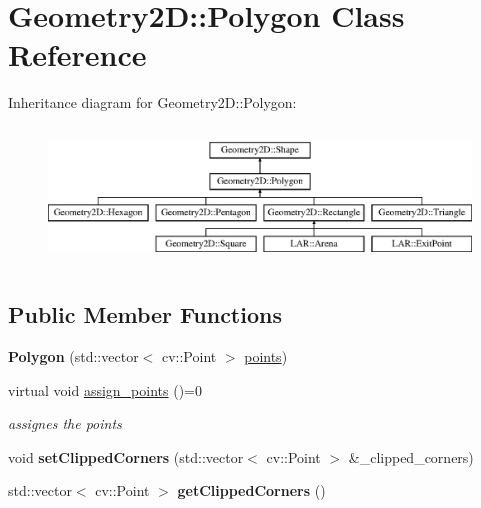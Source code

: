 \hypertarget{class_geometry2_d_1_1_polygon}{}\section{Geometry2D\+:\+:Polygon Class Reference}
\label{class_geometry2_d_1_1_polygon}
Inheritance diagram for Geometry2D\+:\+:Polygon\+:\begin{figure}[H]
\begin{center}
\leavevmode
\includegraphics[height=3.684211cm]{class_geometry2_d_1_1_polygon}
\end{center}
\end{figure}
\subsection*{Public Member Functions}
\begin{DoxyCompactItemize}
\item 
\mbox{\label{class_geometry2_d_1_1_polygon_a6b54a628e1da8663d7b5305ffbde5463}} 
{\bfseries Polygon} (std\+::vector$<$ cv\+::\+Point $>$ \mbox{\hyperlink{class_geometry2_d_1_1_polygon_ab965e028324c2199022da00ff7eef14b}{points}})
\item 
\mbox{\label{class_geometry2_d_1_1_polygon_a69276175f17a9a8c6171fdb5baaac778}} 
virtual void \mbox{\hyperlink{class_geometry2_d_1_1_polygon_a69276175f17a9a8c6171fdb5baaac778}{assign\+\_\+points}} ()=0
\begin{DoxyCompactList}\small\item\em assignes the points \end{DoxyCompactList}\item 
\mbox{\label{class_geometry2_d_1_1_polygon_ae4a1f9df4b63affdce17f1926753ccd7}} 
void {\bfseries set\+Clipped\+Corners} (std\+::vector$<$ cv\+::\+Point $>$ \&\+\_\+clipped\+\_\+corners)
\item 
\mbox{\label{class_geometry2_d_1_1_polygon_aedcccb53780e5f6cd49027200d35c370}} 
std\+::vector$<$ cv\+::\+Point $>$ {\bfseries get\+Clipped\+Corners} ()
\end{DoxyCompactItemize}
